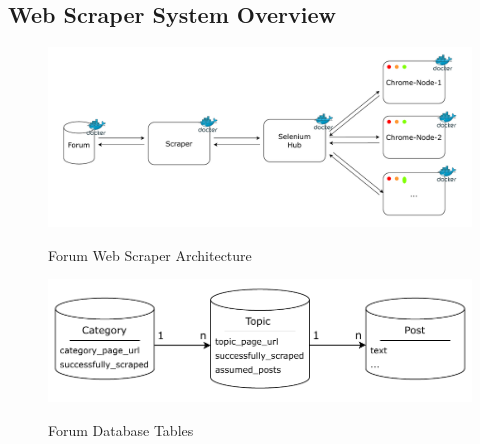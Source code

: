 \subsection{Web Scraper System Overview}\label{subsec:building-the-web-scraper}
\begin{figure}
    \begin{center}
        \includegraphics[width=\textwidth]{figures/data_collection/forum_scraper_architecture}
        \caption{Forum Web Scraper Architecture}\label{fig:forum-scraper-architecture}
        \includegraphics[scale=0.7]{figures/data_collection/forum_data_architecture}
        \caption{Forum Database Tables}\label{fig:forum-data-architecture}
    \end{center}
\end{figure}

